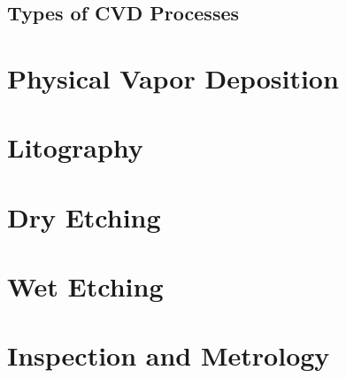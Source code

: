 \documentclass[12pt,a4paper]{report}
\begin{document}
\subsection{Types of CVD Processes}



















\section{Physical Vapor Deposition}
\section{Litography}
\section{Dry Etching}
\section{Wet Etching}
\section{Inspection and Metrology}









\pagebreak
\end{document}
